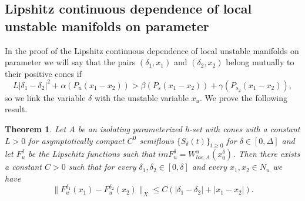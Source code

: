 \documentclass[11pt, leqno]{amsart}
\newtheorem{thm}{Theorem}[section]
\theoremstyle{definition}
\begin{document}
\subsection{Lipshitz continuous dependence of local unstable manifolds on parameter} In the proof of the Lipshitz continuous dependence of local unstable manifolds on  parameter we will say that the pairs $(\delta_1,x_1)$ and $(\delta_2,x_2)$ belong mutually to their positive cones if
$$L|\delta_1-\delta_2|^2+\alpha(P_u (x_1-x_2))>  \beta(P_{s} (x_1-x_2)) + \gamma(P_{s_2} (x_1-x_2)) ,
$$ so we link the variable $\delta$ with the unstable variable $x_u$. We prove the following result.
\begin{thm}\label{thm:unstable}
	Let $A$ be an isolating parameterized h-set with cones with a constant $L>0$ for asymptotically compact $C^0$ semiflows $\{ S_\delta(t) \}_{t\geq 0}$ for $\delta \in [0,\Delta]$ and let $F_u^\delta$ be the Lipschitz functions such that $im F_u^\delta = W^u_{loc,A}(x_0^\delta)$. Then there exists a constant
	$C > 0$ such that for every $\delta_1, \delta_2 \in [0,\delta]$ and every $x_1,x_2 \in N_u$ we have
	$$
	\|F_u^{\delta_1}(x_1) - F_u^{\delta_2}(x_2)\|_X \leq C ( |\delta_1-\delta_2| + |x_1-x_2|).
	$$
\end{thm}
\end{document}
